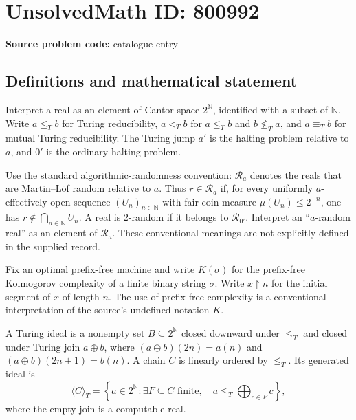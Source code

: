 \documentclass[11pt]{article}
\newcommand{\N}{\mathbb{N}}
\begin{document}
\section*{UnsolvedMath ID: 800992}
\textbf{Source problem code:} catalogue entry
\subsection{Definitions and mathematical statement}
Interpret a real as an element of Cantor space \(2^{\N}\), identified with a subset of \(\N\). Write \(a\leq_T b\) for Turing reducibility, \(a<_T b\) for \(a\leq_T b\) and \(b\not\leq_T a\), and \(a\equiv_T b\) for mutual Turing reducibility. The Turing jump \(a'\) is the halting problem relative to \(a\), and \(0'\) is the ordinary halting problem.

Use the standard algorithmic-randomness convention: \(\mathcal R_a\) denotes the reals that are Martin--L\"of random relative to \(a\). Thus \(r\in\mathcal R_a\) if, for every uniformly \(a\)-effectively open sequence \((U_n)_{n\in\N}\) with fair-coin measure \(\mu(U_n)\leq 2^{-n}\), one has \(r\notin\bigcap_{n\in\N}U_n\). A real is \(2\)-random if it belongs to \(\mathcal R_{0'}\). Interpret an ``\(a\)-random real'' as an element of \(\mathcal R_a\). These conventional meanings are not explicitly defined in the supplied record.

Fix an optimal prefix-free machine and write \(K(\sigma)\) for the prefix-free Kolmogorov complexity of a finite binary string \(\sigma\). Write \(x\upharpoonright n\) for the initial segment of \(x\) of length \(n\). The use of prefix-free complexity is a conventional interpretation of the source's undefined notation \(K\).

A Turing ideal is a nonempty set \(B\subseteq 2^{\N}\) closed downward under \(\leq_T\) and closed under Turing join \(a\oplus b\), where \((a\oplus b)(2n)=a(n)\) and \((a\oplus b)(2n+1)=b(n)\). A chain \(C\) is linearly ordered by \(\leq_T\). Its generated ideal is
\[
\langle C\rangle_T=\left\{a\in 2^{\N}:\exists F\subseteq C\text{ finite},\quad a\leq_T\bigoplus_{c\in F}c\right\},
\]
where the empty join is a computable real.
\end{document}
